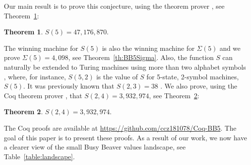 \documentclass[a4paper,british]{article}
\theoremstyle{definition} %
\newtheorem{theorem}{Theorem}[section]
\numberwithin{equation}{section}
\theoremstyle{definition} %
\newcommand{\BBtheFifth}{47{,}176{,}870}
\newcommand{\SigmaTheFifth}{4{,}098}
\newcommand{\BBTxF}{3{,}932{,}974}
\begin{document}
Our main result is to prove this conjecture, using the \Coq theorem prover \cite{the_coq_development_team_2024_14542673}, see Theorem~\ref{th:BB5}:

\begin{theorem}\label{th:BB5}
    $S(5) = \BBtheFifth$.
\end{theorem}

The winning machine for $S(5)$ is also the winning machine for $\Sigma(5)$ and we prove $\Sigma(5) = \SigmaTheFifth$, see Theorem~\ref{th:BB5Sigma}. Also, the function $S$ can naturally be extended to Turing machines using more than two alphabet symbols \cite{BradyMeaningOfLife}, where, for instance, $S(5,2)$ is the value of $S$ for 5-state, 2-symbol machines, \ie $S(5)$. It was previously known that $S(2,3) = 38$ \cite{BradyMeaningOfLife, MICHEL200445, LafittePapazian2007}. We also prove, using the Coq theorem prover \cite{the_coq_development_team_2024_14542673}, that $S(2,4) = \BBTxF$, see Theorem~\ref{th:BB24}:

\begin{theorem}\label{th:BB24}
    $S(2,4) = \BBTxF$.
\end{theorem}

The Coq proofs are available at \url{https://github.com/ccz181078/Coq-BB5}. The goal of this paper is to present these proofs. As a result of our work, we now have a clearer view of the small Busy Beaver values landscape, see Table~\ref{table:landscape}.
\end{document}
